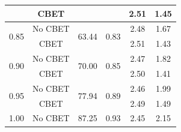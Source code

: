 \begin{table}[]
\begin{tabular}{cccccc}
                          & CBET    &                                                                                    &                                                                         & 2.51                                                                      & 1.45                                 \\ \hline
    \multirow{2}{*}{0.85} & No CBET & \multirow{2}{*}{63.44}                                                             & \multirow{2}{*}{0.83}                                                   & 2.48                                                                      & 1.67                                 \\
                          & CBET    &                                                                                    &                                                                         & 2.51                                                                      & 1.43                                 \\ \hline
    \multirow{2}{*}{0.90} & No CBET & \multirow{2}{*}{70.00}                                                             & \multirow{2}{*}{0.85}                                                   & 2.47                                                                      & 1.82                                 \\
                          & CBET    &                                                                                    &                                                                         & 2.50                                                                      & 1.41                                 \\ \hline
    \multirow{2}{*}{0.95} & No CBET & \multirow{2}{*}{77.94}                                                             & \multirow{2}{*}{0.89}                                                   & 2.46                                                                      & 1.99                                 \\
                          & CBET    &                                                                                    &                                                                         & 2.49                                                                      & 1.49                                 \\ \hline
    \multirow{2}{*}{1.00} & No CBET & \multirow{2}{*}{87.25}                                                             & \multirow{2}{*}{0.93}                                                   & 2.45                                                                      & 2.15                                 \\

\end{tabular}
\end{table}
